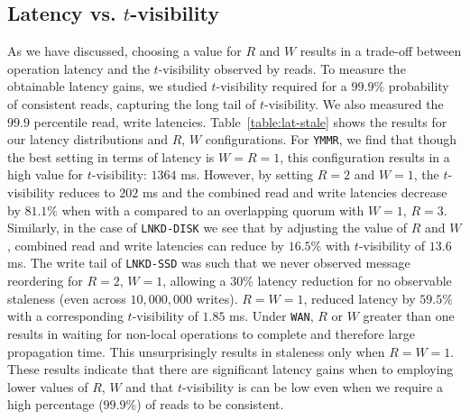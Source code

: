 \documentclass{vldb}
\begin{document}
\subsection{Latency vs. $t$-visibility}

As we have discussed, choosing a value for $R$ and $W$ results in a
trade-off between operation latency and the $t$-visibility observed by
reads. To measure the obtainable latency gains, we studied
$t$-visibility required for a $99.9\%$ probability of consistent
reads, capturing the long tail of $t$-visibility.  We also measured
the $99.9$ percentile read, write latencies.
Table~\ref{table:lat-stale} shows the results for our latency
distributions and $R$, $W$ configurations.  For \texttt{YMMR}, we find
that though the best setting in terms of latency is $W$$=$$R$$=$$1$,
this configuration results in a high value for $t$-visibility: $1364$
ms. However, by setting $R$$=$$2$ and $W$$=$$1$, the $t$-visibility
reduces to $202$ ms and the combined read and write latencies decrease
by $81.1\%$ when with a compared to an overlapping quorum with
$W$$=$$1$, $R$$=$$3$.  Similarly, in the case of \texttt{LNKD-DISK} we
see that by adjusting the value of $R$ and $W$, combined read and
write latencies can reduce by $16.5\%$ with $t$-visibility of $13.6$
ms.  The write tail of \texttt{LNKD-SSD} was such that we never
observed message reordering for $R$$=$$2$, $W$$=$$1$, allowing a 30\%
latency reduction for no observable staleness (even across
$10,000,000$ writes).  $R$$=$$W$$=$$1$, reduced latency by $59.5\%$
with a corresponding $t$-visibility of $1.85$ ms.  Under \texttt{WAN},
$R$ or $W$ greater than one results in waiting for non-local
operations to complete and therefore large propagation time.  This
unsurprisingly results in staleness only when $R$$=$$W$$=$$1$.  These
results indicate that there are significant latency gains when to
employing lower values of $R$, $W$ and that $t$-visibility is can be
low even when we require a high percentage ($99.9\%$) of reads to be
consistent.
\end{document}

